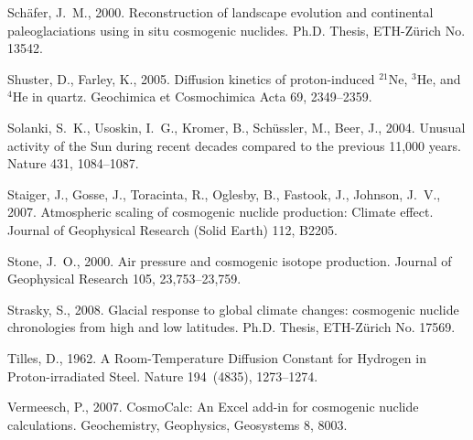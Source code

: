 \documentclass{article}
\begin{document}
\begin{thebibliography}{34}
Sch\"{a}fer, J.~M., 2000. Reconstruction of landscape evolution and continental
  paleoglaciations using in situ cosmogenic nuclides. Ph.D. Thesis,
  ETH-Z\"{u}rich No. 13542.

Shuster, D., Farley, K., 2005. Diffusion kinetics of proton-induced
  $^{21}${N}e, $^{3}${H}e, and $^{4}${H}e in quartz. Geochimica et Cosmochimica
  Acta 69, 2349--2359.

{Solanki}, S.~K., {Usoskin}, I.~G., {Kromer}, B., {Sch{\"u}ssler}, M., {Beer},
  J., 2004. {Unusual activity of the Sun during recent decades compared to the
  previous 11,000 years}. Nature 431, 1084--1087.

{Staiger}, J., {Gosse}, J., {Toracinta}, R., {Oglesby}, B., {Fastook}, J.,
  {Johnson}, J.~V., 2007. {Atmospheric scaling of cosmogenic nuclide
  production: Climate effect}. Journal of Geophysical Research (Solid Earth)
  112, B2205.

Stone, J.~O., 2000. Air pressure and cosmogenic isotope production. Journal of
  Geophysical Research 105, 23,753--23,759.

Strasky, S., 2008. Glacial response to global climate changes: cosmogenic
  nuclide chronologies from high and low latitudes. Ph.D. Thesis,
  ETH-Z\"{u}rich No. 17569.

Tilles, D., 1962. {A Room-Temperature Diffusion Constant for Hydrogen in
  Proton-irradiated Steel}. Nature 194~(4835), 1273--1274.

{Vermeesch}, P., 2007. {CosmoCalc: An Excel add-in for cosmogenic nuclide
  calculations}. Geochemistry, Geophysics, Geosystems 8, 8003.

\end{thebibliography}


%
%
%
%

\clearpage

\listoffigures

\listoftables

\clearpage
\end{document}
